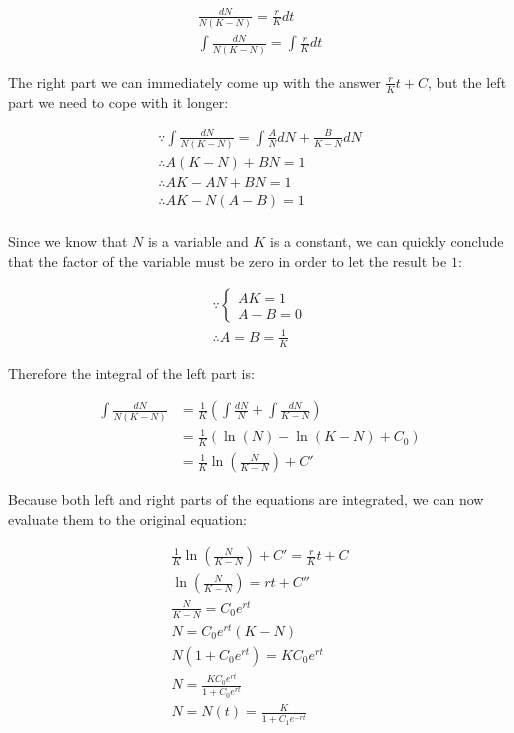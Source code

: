 $$
\begin{aligned}
	\frac{dN}{N(K-N)}=\frac{r}Kdt \\
	\int\frac{dN}{N(K-N)}=\int\frac{r}Kdt
\end{aligned}
$$

The right part we can immediately come up with the answer $\frac{r}Kt+C$, but
the left part we need to cope with it longer:

$$
\begin{aligned}
	\because\int\frac{dN}{N(K-N)}=\int\frac{A}{N}dN+\frac{B}{K-N}dN \\
	\therefore A(K-N)+BN=1 \\
	\therefore AK-AN+BN=1 \\
	\therefore AK-N(A-B)=1 \\
\end{aligned}
$$

Since we know that $N$ is a variable and $K$ is a constant, we can quickly
conclude that the factor of the variable must be zero in order to let the result
be $1$:

$$
\begin{aligned}
	\because\begin{cases}
		AK=1 \\
		A-B=0
	\end{cases} \\
	\therefore A=B=\frac1K
\end{aligned}
$$

Therefore the integral of the left part is:

$$
\begin{aligned}
	\int\frac{dN}{N(K-N)}
	&=\frac1K\left(\int\frac{dN}{N}+\int\frac{dN}{K-N}\right) \\
	&=\frac1K\left(\ln(N)-\ln(K-N)+C_0\right) \\
	&=\frac1K\ln(\frac{N}{K-N})+C'
\end{aligned}
$$

Because both left and right parts of the equations are integrated, we can now
evaluate them to the original equation:

$$
\begin{aligned}
	\frac1K\ln(\frac{N}{K-N})+C'=\frac{r}Kt+C \\
	\ln(\frac{N}{K-N})=rt+C'' \\
	\frac{N}{K-N}=C_0e^{rt} \\
	N=C_0e^{rt}(K-N) \\
	N(1+C_0e^{rt})=KC_0e^{rt} \\
	N=\frac{KC_0e^{rt}}{1+C_0e^{rt}} \\
	N=N(t)=\frac{K}{1+C_1e^{-rt}}
\end{aligned}
$$

